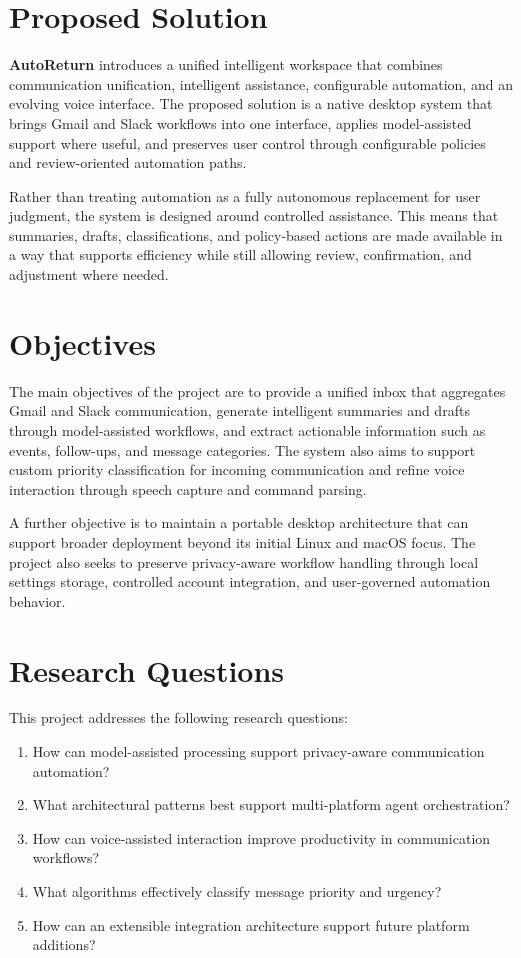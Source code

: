 \section{Proposed Solution}
\textbf{AutoReturn} introduces a unified intelligent workspace that combines communication unification, intelligent assistance, configurable automation, and an evolving voice interface. The proposed solution is a native desktop system that brings Gmail and Slack workflows into one interface, applies model-assisted support where useful, and preserves user control through configurable policies and review-oriented automation paths.

Rather than treating automation as a fully autonomous replacement for user judgment, the system is designed around controlled assistance. This means that summaries, drafts, classifications, and policy-based actions are made available in a way that supports efficiency while still allowing review, confirmation, and adjustment where needed.

\section{Objectives}
The main objectives of the project are to provide a unified inbox that aggregates Gmail and Slack communication, generate intelligent summaries and drafts through model-assisted workflows, and extract actionable information such as events, follow-ups, and message categories. The system also aims to support custom priority classification for incoming communication and refine voice interaction through speech capture and command parsing.

A further objective is to maintain a portable desktop architecture that can support broader deployment beyond its initial Linux and macOS focus. The project also seeks to preserve privacy-aware workflow handling through local settings storage, controlled account integration, and user-governed automation behavior.

\section{Research Questions}
This project addresses the following research questions:
\begin{enumerate}
    \item How can model-assisted processing support privacy-aware communication automation?
    \item What architectural patterns best support multi-platform agent orchestration?
    \item How can voice-assisted interaction improve productivity in communication workflows?
    \item What algorithms effectively classify message priority and urgency?
    \item How can an extensible integration architecture support future platform additions?
\end{enumerate}

